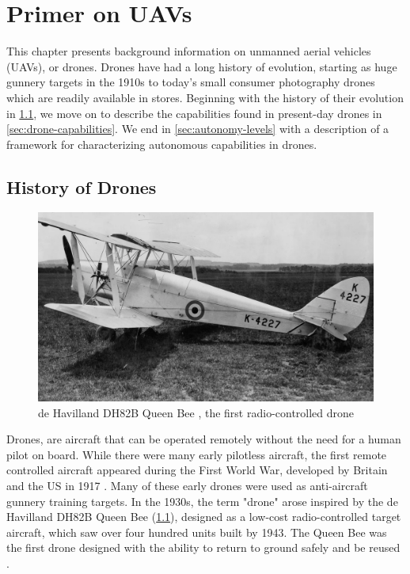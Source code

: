 \chapter{Primer on UAVs}
\label{ch:uav-primer}

This chapter presents background information on unmanned aerial vehicles
(UAVs), or drones. Drones have had a long history of evolution, starting as
huge gunnery targets in the 1910s to today's small consumer photography drones
which are readily available in stores. Beginning with the history of their
evolution in \cref{sec:drone-history}, we move on to describe the capabilities
found in present-day drones in \cref{sec:drone-capabilities}. We end in
\cref{sec:autonomy-levels} with a description of a framework for characterizing
autonomous capabilities in drones.

\section{History of Drones}
\label{sec:drone-history}

\begin{figure}[htbp]
\centerline{\includegraphics[width = .6\textwidth]{figs/queenbee.png}}
\caption{de Havilland DH82B Queen Bee \cite{baesystems}, the first radio-controlled drone}
\label{fig:queen-bee}
\end{figure}

Drones, are aircraft that can be operated remotely without the need for a human
pilot on board. While there were many early pilotless aircraft, the first
remote controlled aircraft appeared during the First World War, developed by
Britain and the US in 1917 \cite{dronehistory}. Many of these early drones were
used as anti-aircraft gunnery training targets. In the 1930s, the term "drone"
arose inspired by the de Havilland DH82B Queen Bee (\cref{fig:queen-bee}),
designed as a low-cost radio-controlled target aircraft, which saw over four
hundred units built by 1943. The Queen Bee was the first drone designed with
the ability to return to ground safely and be reused \cite{queenbee, pbs05}.

